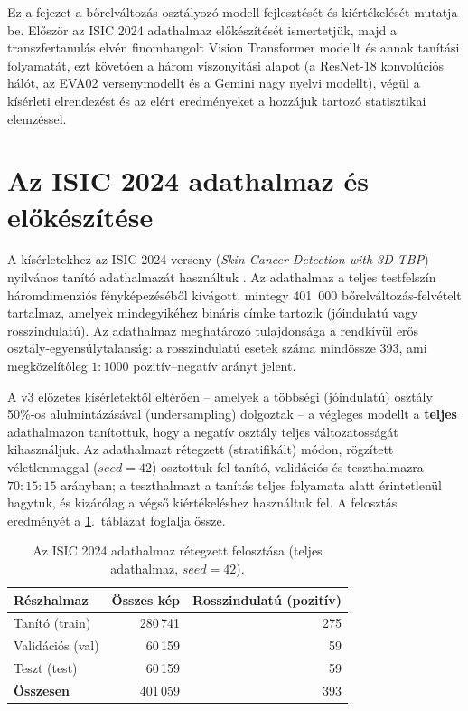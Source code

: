 
Ez a fejezet a bőrelváltozás-osztályozó modell fejlesztését és kiértékelését
mutatja be. Először az ISIC 2024 adathalmaz előkészítését ismertetjük, majd a
transzfertanulás elvén finomhangolt Vision Transformer modellt és annak
tanítási folyamatát, ezt követően a három viszonyítási alapot (a ResNet-18
konvolúciós hálót, az EVA02 versenymodellt és a Gemini nagy nyelvi
modellt), végül a kísérleti elrendezést és az elért eredményeket a hozzájuk
tartozó statisztikai elemzéssel.

\section{Az ISIC 2024 adathalmaz és előkészítése}

A kísérletekhez az ISIC 2024 verseny (\textit{Skin Cancer Detection with 3D-TBP})
nyilvános tanító adathalmazát használtuk \cite{isic2024}. Az adathalmaz a teljes
testfelszín háromdimenziós fényképezéséből kivágott, mintegy 401~000
bőrelváltozás-felvételt tartalmaz, amelyek mindegyikéhez bináris címke tartozik
(jó\-indulatú vagy rosszindulatú). Az adathalmaz meghatározó tulajdonsága a
rendkívül erős osztály-egyensúlytalanság: a rosszindulatú esetek száma mindössze
393, ami megközelítőleg $1{:}1000$ pozitív--negatív arányt jelent.

A v3 előzetes kísérletektől eltérően -- amelyek a többségi (jóindulatú) osztály
50\%-os alulmintázásával (undersampling) dolgoztak -- a végleges modellt a \textbf{teljes}
adathalmazon tanítottuk, hogy a negatív osztály teljes változatosságát
kihasználjuk. Az adathalmazt rétegzett (stratifikált) módon, rögzített
véletlenmaggal ($seed = 42$) osztottuk fel tanító, validációs és teszthalmazra
$70{:}15{:}15$ arányban; a teszthalmazt a tanítás teljes folyamata alatt
érintetlenül hagytuk, és kizárólag a végső kiértékeléshez használtuk fel. A
felosztás eredményét a \ref{tab:split}.~táblázat foglalja össze.

\begin{table}[H]
  \centering
  \caption{Az ISIC 2024 adathalmaz rétegzett felosztása (teljes adathalmaz, $seed=42$).}
  \label{tab:split}
  \begin{tabular}{lrr}
    \hline
    \textbf{Részhalmaz} & \textbf{Összes kép} & \textbf{Rosszindulatú (pozitív)} \\
    \hline
    Tanító (train)      & 280\,741 & 275 \\
    Validációs (val)    & 60\,159  & 59  \\
    Teszt (test)        & 60\,159  & 59  \\
    \hline
    \textbf{Összesen}   & 401\,059 & 393 \\
    \hline
  \end{tabular}
\end{table}

